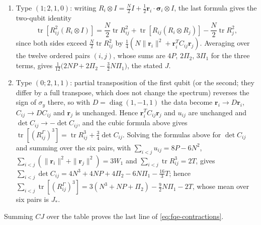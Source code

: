 \begin{enumerate}
\item[(d)] Type \((1;2,1,0)\): writing \(R_i\otimes I=\frac N2I+\frac12\mathbf r_i\!\cdot\!\boldsymbol\sigma_i\otimes I\), the last formula gives the
two-qubit identity \[
\operatorname{tr}[R_{ij}^2(R_i\otimes I)]
=\frac N2\operatorname{tr}R_{ij}^2
+\operatorname{tr}[R_{ij}(R_i\otimes R_j)]
-\frac N2\operatorname{tr}R_j^2 ,
\] since both sides exceed \(\frac N2\operatorname{tr}R_{ij}^2\) by \(\frac14(N\|\mathbf r_i\|^2+\mathbf r_i^TC_{ij}\mathbf r_j)\). Averaging over the twelve ordered pairs
\((i,j)\), whose sums are \(4P\), \(2\Pi_2\), \(3\Pi_1\) for the three terms, gives \(\frac1{12}\bigl(2NP+2\Pi_2-\frac32N\Pi_1\bigr)\), the stated \(J\).
\item[(e)] Type \((0;2,1,1)\): partial transposition of the first qubit (or the second; they differ by a full transpose, which does not change the spectrum) reverses the sign of \(\sigma_y\) there, so
with \(D=\operatorname{diag}(1,-1,1)\) the data become \(\mathbf r_i\to D\mathbf r_i\), \(C_{ij}\to DC_{ij}\) and \(\mathbf r_j\) is unchanged. Hence
\(\mathbf r_i^TC_{ij}\mathbf r_j\) and \(u_{ij}\) are unchanged and \(\det C_{ij}\to-\det C_{ij}\), and the cubic formula above gives
\(\operatorname{tr}[(R_{ij}^{\Gamma})^3]=\operatorname{tr}R_{ij}^3+\tfrac34\det C_{ij}\). Solving the formulas above for
\(\det C_{ij}\) and summing over the six pairs, with \(\sum_{i<j}u_{ij}=8P-6N^2\), \(\sum_{i<j}(\|\mathbf r_i\|^2+\|\mathbf r_j\|^2)=3W_1\) and \(\sum_{i<j}\operatorname{tr}R_{ij}^3=2T\), gives
\(\sum_{i<j}\det C_{ij}=4N^3+4NP+4\Pi_2-6N\Pi_1-\tfrac{16}3T\); hence \(\sum_{i<j}\operatorname{tr}[(R_{ij}^\Gamma)^3]=3(N^3+NP+\Pi_2)-\tfrac92N\Pi_1-2T\), whose mean over six pairs is \(J_*\).
\end{enumerate}
Summing \(CJ\) over the table proves the last line of \eqref{eq:fqe-contractions}.

